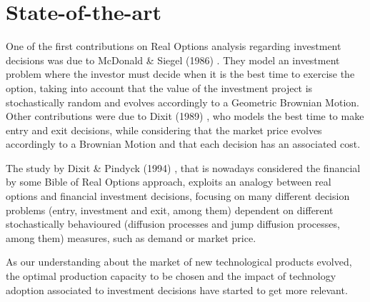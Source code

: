 
\section{State-of-the-art}


One of the first contributions on Real Options analysis regarding investment decisions was due to McDonald \& Siegel (1986)  \cite{siegel}. They model an investment problem where the investor must decide when it is the best time to exercise the option, taking into account that the value of the investment project is stochastically random and evolves accordingly to a Geometric Brownian Motion. Other contributions were due to Dixit (1989) \cite{dixit_alone}, who models the best time to make entry and exit decisions, while considering that the market price evolves accordingly to a Brownian Motion and that each decision has an associated cost.

The study by Dixit \& Pindyck (1994) \cite{dixit:book}, that is nowadays considered the financial by some Bible of Real Options approach, exploits an analogy between real options and financial investment decisions, focusing on many different decision problems (entry, investment and exit, among them) dependent on different stochastically behavioured (diffusion processes and jump diffusion processes, among them) measures, such as demand or market price.


As our understanding about the market of new technological products evolved, the optimal production capacity to be chosen and the impact of technology adoption associated to investment decisions have started to get more relevant.

